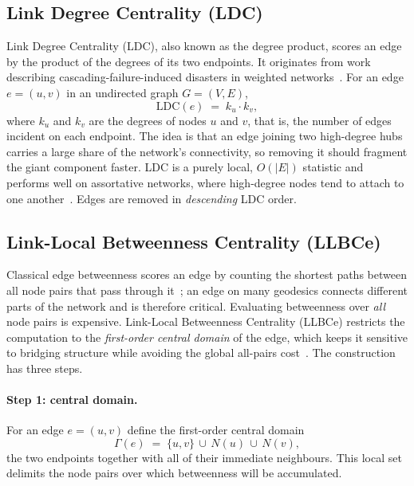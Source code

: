 \documentclass[runningheads,11pt]{article}
\begin{document}
\subsection{Link Degree Centrality (LDC)}
\label{sec:ldc}
Link Degree Centrality (LDC), also known as the degree product, scores an edge
by the product of the degrees of its two endpoints. It originates from work
describing cascading-failure-induced disasters in weighted
networks~\cite{wang2008universal}. For an edge $e=(u,v)$ in an undirected graph
$G=(V,E)$,
\begin{equation}
\mathrm{LDC}(e) \;=\; k_u \cdot k_v,
\label{eq:ldc}
\end{equation}
where $k_u$ and $k_v$ are the degrees of nodes $u$ and $v$, that is, the
number of edges incident on each endpoint. The idea is that an edge joining
two high-degree hubs carries a large share of the network's connectivity, so
removing it should fragment the giant component faster. LDC is a purely local,
$O(|E|)$ statistic and performs well on assortative networks, where high-degree
nodes tend to attach to one another~\cite{wang2008universal}. Edges are removed
in \emph{descending} LDC order.

\subsection{Link-Local Betweenness Centrality (LLBCe)}
\label{sec:llbce}
Classical edge betweenness scores an edge by counting the shortest paths between
all node pairs that pass through it~\cite{xia2008attack}; an edge on many
geodesics connects different parts of the network and is therefore critical.
Evaluating betweenness over \emph{all} node pairs is expensive. Link-Local
Betweenness Centrality (LLBCe) restricts the computation to the \emph{first-order
central domain} of the edge, which keeps it sensitive to bridging structure while
avoiding the global all-pairs cost~\cite{entropy2024llbme}. The construction has
three steps.

\paragraph{Step 1: central domain.}
For an edge $e=(u,v)$ define the first-order central domain
\begin{equation}
\Gamma(e) \;=\; \{u,v\}\,\cup\, N(u)\,\cup\, N(v),
\label{eq:gamma}
\end{equation}
the two endpoints together with all of their immediate neighbours. This local
set delimits the node pairs over which betweenness will be accumulated.
\end{document}
